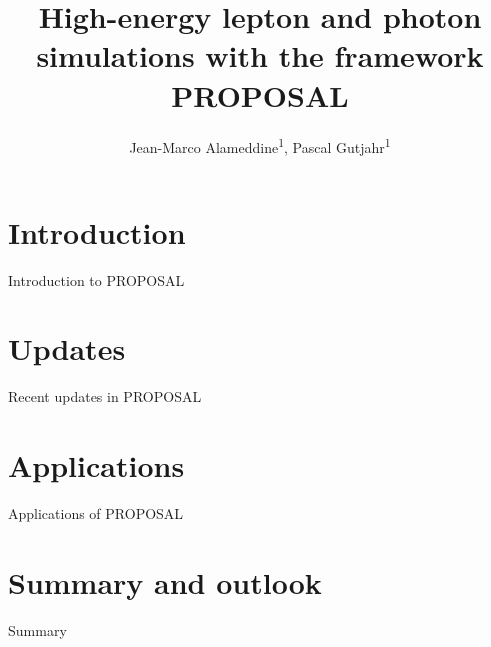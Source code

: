 \documentclass[aspectratio=1610, 9pt]{beamer}
\title{High-energy lepton and photon simulations with the framework PROPOSAL}
\author[jean-marco.alameddine@tu-dortmund.de]{Jean-Marco Alameddine\textsuperscript{1}, Pascal Gutjahr\textsuperscript{1}}
\institute[]{Astroparticle Physics WG Rhode - TU Dortmund University\textsuperscript{1}}
\date[]{}
\begin{document}

\maketitle

\section{Introduction}

\begin{frame}
  \begin{center}
    \Huge Introduction to PROPOSAL
  \end{center}
\end{frame}



\section{Updates}

\begin{frame}
  \begin{center}
    \Huge Recent updates in PROPOSAL
  \end{center}
\end{frame}



\section{Applications}

\begin{frame}
  \begin{center}
    \Huge Applications of PROPOSAL
  \end{center}
\end{frame}



\section{Summary and outlook}

\begin{frame}
  \begin{center}
    \Huge Summary
  \end{center}
\end{frame}


\end{document}
